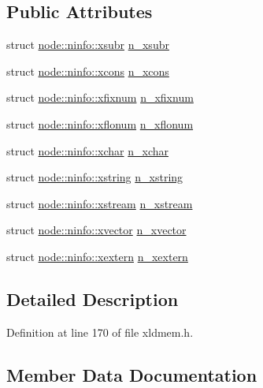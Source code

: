 \subsection*{Public Attributes}
\begin{DoxyCompactItemize}
\item 
struct \hyperlink{structnode_1_1ninfo_1_1xsubr}{node\+::ninfo\+::xsubr} \hyperlink{unionnode_1_1ninfo_a50b45dbe48fd9a60cd10bad312710862}{n\+\_\+xsubr}
\item 
struct \hyperlink{structnode_1_1ninfo_1_1xcons}{node\+::ninfo\+::xcons} \hyperlink{unionnode_1_1ninfo_a414fced4526c0905107cdadc6528105c}{n\+\_\+xcons}
\item 
struct \hyperlink{structnode_1_1ninfo_1_1xfixnum}{node\+::ninfo\+::xfixnum} \hyperlink{unionnode_1_1ninfo_a2b534a7fc6ba5d511aabc63a96328997}{n\+\_\+xfixnum}
\item 
struct \hyperlink{structnode_1_1ninfo_1_1xflonum}{node\+::ninfo\+::xflonum} \hyperlink{unionnode_1_1ninfo_ac9ab3fbda1c6ff6211d1f751f8ee8483}{n\+\_\+xflonum}
\item 
struct \hyperlink{structnode_1_1ninfo_1_1xchar}{node\+::ninfo\+::xchar} \hyperlink{unionnode_1_1ninfo_ab0e6118dce934cbadeb634fa53d55cd0}{n\+\_\+xchar}
\item 
struct \hyperlink{structnode_1_1ninfo_1_1xstring}{node\+::ninfo\+::xstring} \hyperlink{unionnode_1_1ninfo_a00041541f3e8a24540bd3458251ad664}{n\+\_\+xstring}
\item 
struct \hyperlink{structnode_1_1ninfo_1_1xstream}{node\+::ninfo\+::xstream} \hyperlink{unionnode_1_1ninfo_a49d570518da3aac9391a0a2774cd3cc5}{n\+\_\+xstream}
\item 
struct \hyperlink{structnode_1_1ninfo_1_1xvector}{node\+::ninfo\+::xvector} \hyperlink{unionnode_1_1ninfo_aa45e8492566bb0b3ca628c567da4a309}{n\+\_\+xvector}
\item 
struct \hyperlink{structnode_1_1ninfo_1_1xextern}{node\+::ninfo\+::xextern} \hyperlink{unionnode_1_1ninfo_a319087864f108daf3aeaa34119975e41}{n\+\_\+xextern}
\end{DoxyCompactItemize}


\subsection{Detailed Description}


Definition at line 170 of file xldmem.\+h.



\subsection{Member Data Documentation}
